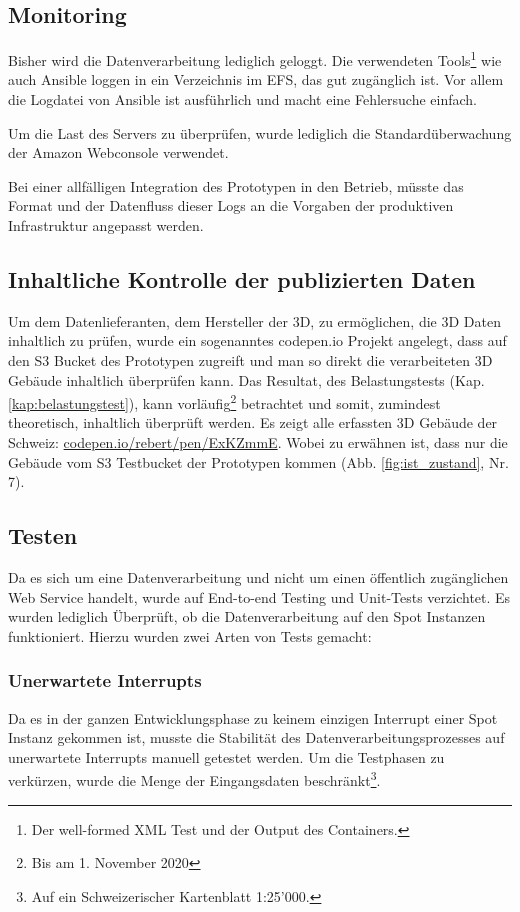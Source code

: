 \subsection{Monitoring}
Bisher wird die Datenverarbeitung lediglich geloggt. Die verwendeten Tools\footnote{Der well-formed XML Test und der Output des Containers.} wie auch Ansible loggen in ein Verzeichnis im EFS, das gut zugänglich ist. Vor allem die Logdatei von Ansible ist ausführlich und macht eine Fehlersuche einfach.

Um die Last des Servers zu überprüfen, wurde lediglich die Standardüberwachung der Amazon Webconsole verwendet.

Bei einer allfälligen Integration des Prototypen in den Betrieb, müsste das Format und der Datenfluss dieser Logs an die Vorgaben der produktiven Infrastruktur angepasst werden.


\subsection{Inhaltliche Kontrolle der publizierten Daten}\label{kap:inhaltlich}
Um dem Datenlieferanten, dem Hersteller der 3D, zu ermöglichen, die 3D Daten inhaltlich zu prüfen, wurde ein sogenanntes codepen.io Projekt angelegt, dass auf den S3 Bucket des Prototypen zugreift und man so direkt die verarbeiteten 3D Gebäude inhaltlich überprüfen kann. Das Resultat, des Belastungstests (Kap. \ref{kap:belastungstest}), kann vorläufig\footnote{Bis am 1. November 2020} betrachtet und somit, zumindest theoretisch, inhaltlich überprüft werden. Es zeigt alle erfassten 3D Gebäude der Schweiz:
\href{https://codepen.io/rebert/pen/ExKZmmE}{codepen.io/rebert/pen/ExKZmmE}. Wobei zu erwähnen ist, dass nur die Gebäude vom S3 Testbucket der Prototypen kommen (Abb. \ref{fig:ist_zustand}, Nr. 7).

\subsection{Testen}
Da es sich um eine Datenverarbeitung und nicht um einen öffentlich zugänglichen Web Service handelt, wurde auf End-to-end Testing und Unit-Tests verzichtet. Es wurden lediglich Überprüft, ob die Datenverarbeitung auf den Spot Instanzen funktioniert. Hierzu wurden zwei Arten von Tests gemacht:

\subsubsection{Unerwartete Interrupts}
Da es in der ganzen Entwicklungsphase zu keinem einzigen Interrupt einer Spot Instanz gekommen ist, musste die Stabilität des Datenverarbeitungsprozesses auf unerwartete Interrupts manuell getestet werden. Um die Testphasen zu verkürzen, wurde die Menge der Eingangsdaten beschränkt\footnote{Auf ein Schweizerischer Kartenblatt 1:25'000.}.

